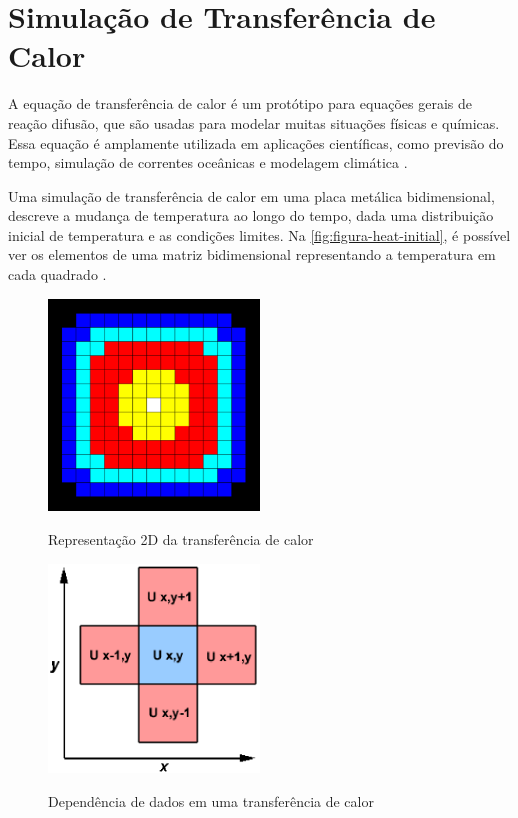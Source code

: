 \section{Simulação de Transferência de Calor}

A equação de transferência de calor é um protótipo para equações gerais de reação difusão, que são usadas para modelar muitas situações físicas e químicas.
Essa equação é amplamente utilizada em aplicações científicas, como previsão do tempo, simulação de correntes oceânicas e modelagem climática \cite{theinparallel}.

Uma simulação de transferência de calor em uma placa metálica bidimensional, descreve a mudança de temperatura ao longo do tempo, dada uma distribuição inicial de temperatura e as condições limites.
Na \autoref{fig:figura-heat-initial}, é possível ver os elementos de uma matriz bidimensional representando a temperatura em cada quadrado \cite{theinparallel}.

\begin{figure}[!htb]
    \centering
    \caption{Representação 2D da transferência de calor}
    \includegraphics[width=0.5\textwidth]{./dados/figuras/heat_initial}
    \label{fig:figura-heat-initial}
\end{figure}

\begin{figure}[!htb]
    \centering
    \caption{Dependência de dados em uma transferência de calor}
    \includegraphics[width=0.5\textwidth]{./dados/figuras/heat_equation}
    \label{fig:figura-heat-equation}
\end{figure}

